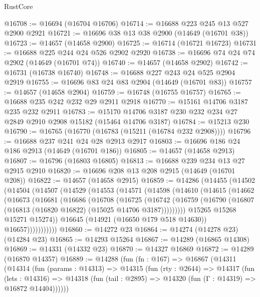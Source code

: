\begin{lexlean}{RustCore}
\begin{coremodule}
@16708 := @16694 (@16704 @16706)
@16714 := @16688 @223 @245 @13 @527 @2900 @2921
@16721 := @16696 @38 @13 @38 @2900 (@14649 (@16701 @38))
@16723 := @14657 (@14658 @2900)
@16725 := @16714 (@16721 @16723)
@16731 := @16688 @225 @244 @24 @526 @2902 @2920
@16738 := @16696 @74 @24 @74 @2902 (@14649 (@16701 @74))
@16740 := @14657 (@14658 @2902)
@16742 := @16731 (@16738 @16740)
@16748 := @16688 @227 @243 @24 @525 @2904 @2919
@16755 := @16696 @83 @24 @83 @2904 (@14649 (@16701 @83))
@16757 := @14657 (@14658 @2904)
@16759 := @16748 (@16755 @16757)
@16765 := @16688 @235 @242 @232 @29 @2911 @2918
@16770 := @15161 @14706 @3187 @235 @232 @2911
@16783 := @15170 @14706 @3187 @230 @232 @234 @27 @2849 @2910 @2908 @15182 (@15464 @14706 @3187)
@16784 := @15213 @230
@16790 := @16765 (@16770 (@16783 (@15211 (@16784 @232 @2908))))
@16796 := @16688 @237 @241 @24 @28 @2913 @2917
@16803 := @16696 @186 @24 @186 @2913 (@14649 (@16701 @186))
@16805 := @14657 (@14658 @2913)
@16807 := @16796 (@16803 @16805)
@16813 := @16688 @239 @234 @13 @27 @2915 @2910
@16820 := @16696 @208 @13 @208 @2915 (@14649 (@16701 @208))
@16822 := @14657 (@14658 @2915)
@16859 := @14286
    (@14455
      (@14502
        (@14504
          (@14507
            (@14529
              (@14553
                (@14571
                  (@14598
                    (@14610
                      (@14615
                        (@14662
                          (@16673
                            (@16681
                              (@16686
                                (@16708
                                  (@16725
                                    (@16742
                                      (@16759
                                        (@16790
                                          (@16807
                                            (@16813 (@16820 @16822) (@15025 @14706 @3187)))))))))
                              @15265
                              @15268
                              @15271
                              @15274))
                          @16645
                          (@14921 (@16650 @179 @518 @14630))
                          @16657)))))))))))
@16860 := @14272 @23
@16864 := @14274 (@14278 @23) (@14284 @23)
@16865 := @14293 @15264
@16867 := @14289 (@16865 @14308)
@16869 := @14331 (@14332 @23)
@16870 := @14327 @16869
@16872 := @14289 (@16870 @14357)
@16889 := @14288
    (fun (fn : @167) =>
    @16867
      (@14311
        (@14314
          (fun (params : @14313) =>
          @14315
            (fun (rty : @2644) =>
            @14317
              (fun (lets : @14316) =>
              @14318 (fun (tail : @2895) => @14320 (fun (Γ : @14319) => @16872 @14404))))))

\end{coremodule}
\end{lexlean}
